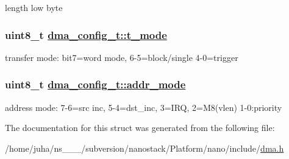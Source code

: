 length low byte \hypertarget{structdma__config__t_e41c35fc1ca1e6b7ddace92021656e4f}{
\subsubsection[t\_\-mode]{\setlength{\rightskip}{0pt plus 5cm}uint8\_\-t \hyperlink{structdma__config__t_e41c35fc1ca1e6b7ddace92021656e4f}{dma\_\-config\_\-t::t\_\-mode}}}
\label{structdma__config__t_e41c35fc1ca1e6b7ddace92021656e4f}


transfer mode: bit7=word mode, 6-5=block/single 4-0=trigger \hypertarget{structdma__config__t_ad91fc2dadb15a7a368fa2731f4a0e8b}{
\subsubsection[addr\_\-mode]{\setlength{\rightskip}{0pt plus 5cm}uint8\_\-t \hyperlink{structdma__config__t_ad91fc2dadb15a7a368fa2731f4a0e8b}{dma\_\-config\_\-t::addr\_\-mode}}}
\label{structdma__config__t_ad91fc2dadb15a7a368fa2731f4a0e8b}


address mode: 7-6=src inc, 5-4=dst\_\-inc, 3=IRQ, 2=M8(vlen) 1-0:priority 

The documentation for this struct was generated from the following file:\begin{CompactItemize}
\item 
/home/juha/ns\_\_\_/subversion/nanostack/Platform/nano/include/\hyperlink{dma_8h}{dma.h}\end{CompactItemize}

